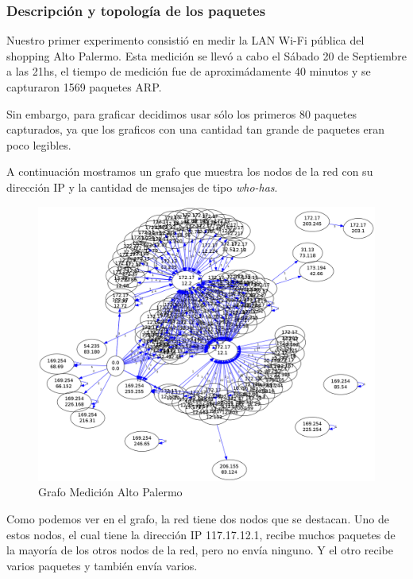 \subsubsection{Descripción y topología de los paquetes}

Nuestro primer experimento consistió en medir la LAN Wi-Fi pública del shopping Alto Palermo. Esta medición se llevó a cabo el Sábado 20 de Septiembre a las 21hs, el tiempo de medición fue de aproximádamente 40 minutos y se capturaron 1569 paquetes ARP.

Sin embargo, para graficar decidimos usar sólo los primeros 80 paquetes capturados, ya que los graficos con una cantidad tan grande de paquetes eran poco legibles.

A continuación mostramos un grafo que muestra los nodos de la red con su dirección IP y la cantidad de mensajes de tipo \emph{who-has}.

\begin{figure}[H]
 \begin{center}
  \includegraphics[width=\linewidth]{../imgs/red-alto-palermo_red.png}
  \caption{Grafo Medición Alto Palermo}
 \end{center}

\end{figure}

Como podemos ver en el grafo, la red tiene dos nodos que se destacan. Uno de estos nodos, el cual tiene la dirección IP 117.17.12.1, recibe muchos paquetes de la mayoría de los otros nodos de la red, pero no envía ninguno. Y el otro recibe varios paquetes y también envía varios.

